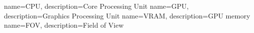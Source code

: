 
\makeglossaries

{
	name=CPU,
	description={Core Processing Unit}
}
{
	name=GPU,
	description={Graphics Processing Unit}
}
{
	name=VRAM,
	description={GPU memory}
}
{
	name=FOV,
	description={Field of View}
}
